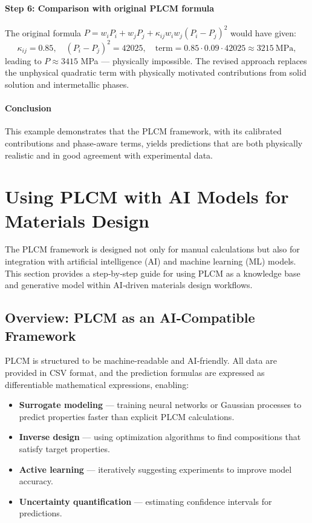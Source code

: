 \documentclass[12pt,a4paper]{article}
\begin{document}
	\paragraph{Step 6: Comparison with original PLCM formula}
	The original formula \(P = w_i P_i + w_j P_j + \kappa_{ij} w_i w_j (P_i - P_j)^2\) would have given:
	\[
	\kappa_{ij} = 0.85, \quad (P_i - P_j)^2 = 42025, \quad \text{term} = 0.85 \cdot 0.09 \cdot 42025 \approx 3215\ \text{MPa},
	\]
	leading to \(P \approx 3415\) MPa — physically impossible. The revised approach replaces the unphysical quadratic term with physically motivated contributions from solid solution and intermetallic phases.
	
	\paragraph{Conclusion}
	This example demonstrates that the PLCM framework, with its calibrated contributions and phase-aware terms, yields predictions that are both physically realistic and in good agreement with experimental data.	
	
	\section{Using PLCM with AI Models for Materials Design}
	\label{sec:ai-integration}
	
	The PLCM framework is designed not only for manual calculations but also for integration with artificial intelligence (AI) and machine learning (ML) models. This section provides a step‑by‑step guide for using PLCM as a knowledge base and generative model within AI‑driven materials design workflows.
	
	\subsection{Overview: PLCM as an AI‑Compatible Framework}
	
	PLCM is structured to be machine‑readable and AI‑friendly. All data are provided in CSV format, and the prediction formulas are expressed as differentiable mathematical expressions, enabling:
	
	\begin{itemize}
		\item \textbf{Surrogate modeling} — training neural networks or Gaussian processes to predict properties faster than explicit PLCM calculations.
		\item \textbf{Inverse design} — using optimization algorithms to find compositions that satisfy target properties.
		\item \textbf{Active learning} — iteratively suggesting experiments to improve model accuracy.
		\item \textbf{Uncertainty quantification} — estimating confidence intervals for predictions.
	\end{itemize}
	
\end{document}
